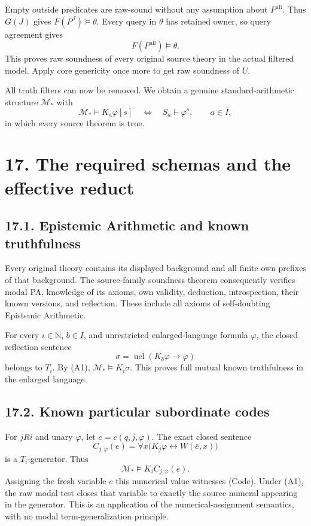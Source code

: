 \documentclass[
  11pt,
  letterpaper,
]{article}
\begin{document}
Empty outside predicates are raw-sound without any assumption about
\(P^{\mathrm{all}}\). Thus \(G(J)\) gives \(F(P^J)\models\theta\). Every
query in \(\theta\) has retained owner, so query agreement gives \[
F(P^{\mathrm{all}})\models\theta.
\] This proves raw soundness of every original source theory in the
actual filtered model. Apply core genericity once more to get raw
soundness of \(U\).

All truth filters can now be removed. We obtain a genuine
standard-arithmetic structure \(\mathcal M_*\) with \[
\mathcal M_*\models K_a\varphi[s]
\quad\Longleftrightarrow\quad
S_a\vdash\varphi^s,
\qquad a\in I,
\tag{A1}
\] in which every source theorem is true.

\section{17. The required schemas and the effective
reduct}\label{the-required-schemas-and-the-effective-reduct}

\subsection{17.1. Epistemic Arithmetic and known
truthfulness}\label{epistemic-arithmetic-and-known-truthfulness}

Every original theory contains its displayed background and all finite
own prefixes of that background. The source-family soundness theorem
consequently verifies modal PA, knowledge of its axioms, own validity,
deduction, introspection, their known versions, and reflection. These
include all axioms of self-doubting Epistemic Arithmetic.

For every \(i\in\mathbb N\), \(b\in I\), and unrestricted
enlarged-language formula \(\varphi\), the closed reflection sentence \[
\sigma=\operatorname{ucl}(K_b\varphi\to\varphi)
\] belongs to \(T_i\). By (A1), \(\mathcal M_*\models K_i\sigma\). This
proves full mutual known truthfulness in the enlarged language.

\subsection{17.2. Known particular subordinate
codes}\label{known-particular-subordinate-codes}

For \(jRi\) and unary \(\varphi\), let \(e=c(q,j,\varphi)\). The exact
closed sentence \[
C_{j,\varphi}(e)=
\forall x\bigl(K_j\varphi\leftrightarrow W(\bar e,x)\bigr)
\] is a \(T_i\)-generator. Thus \[
\mathcal M_*\models K_iC_{j,\varphi}(e).
\] Assigning the fresh variable \(e\) this numerical value witnesses
(Code). Under (A1), the raw modal test closes that variable to exactly
the source numeral appearing in the generator. This is an application of
the numerical-assignment semantics, with no modal term-generalization
principle.
\end{document}

